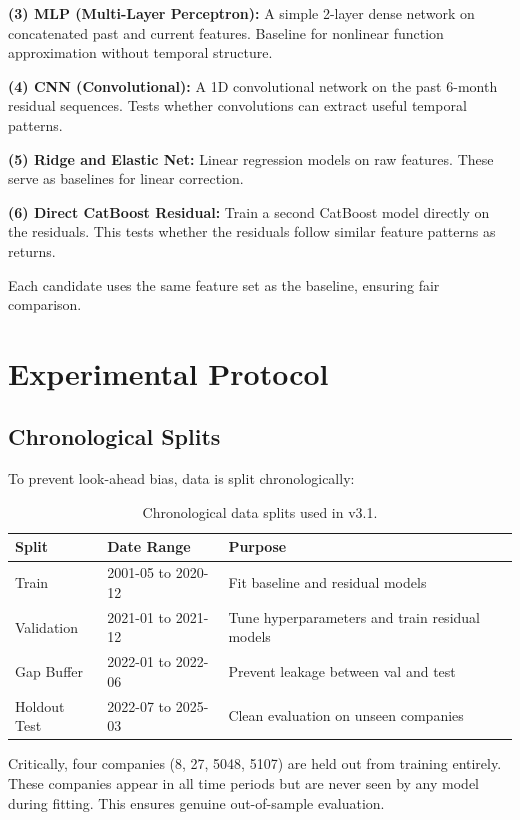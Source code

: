\documentclass[11pt]{article}
\begin{document}
\textbf{(3) MLP (Multi-Layer Perceptron):} A simple 2-layer dense network on concatenated past and current features. Baseline for nonlinear function approximation without temporal structure.

\textbf{(4) CNN (Convolutional):} A 1D convolutional network on the past 6-month residual sequences. Tests whether convolutions can extract useful temporal patterns.

\textbf{(5) Ridge and Elastic Net:} Linear regression models on raw features. These serve as baselines for linear correction.

\textbf{(6) Direct CatBoost Residual:} Train a second CatBoost model directly on the residuals. This tests whether the residuals follow similar feature patterns as returns.

Each candidate uses the same feature set as the baseline, ensuring fair comparison.

\section{Experimental Protocol}

\subsection{Chronological Splits}
To prevent look-ahead bias, data is split chronologically:
\begin{table}[H]
\centering
\caption{Chronological data splits used in v3.1.}
\begin{tabular}{p{3.5cm} p{4.5cm} p{4cm}}
\toprule
Split & Date Range & Purpose \\
\midrule
Train & 2001-05 to 2020-12 & Fit baseline and residual models \\
Validation & 2021-01 to 2021-12 & Tune hyperparameters and train residual models \\
Gap Buffer & 2022-01 to 2022-06 & Prevent leakage between val and test \\
Holdout Test & 2022-07 to 2025-03 & Clean evaluation on unseen companies \\
\bottomrule
\end{tabular}
\end{table}

Critically, four companies (8, 27, 5048, 5107) are held out from training entirely. These companies appear in all time periods but are never seen by any model during fitting. This ensures genuine out-of-sample evaluation.
\end{document}
